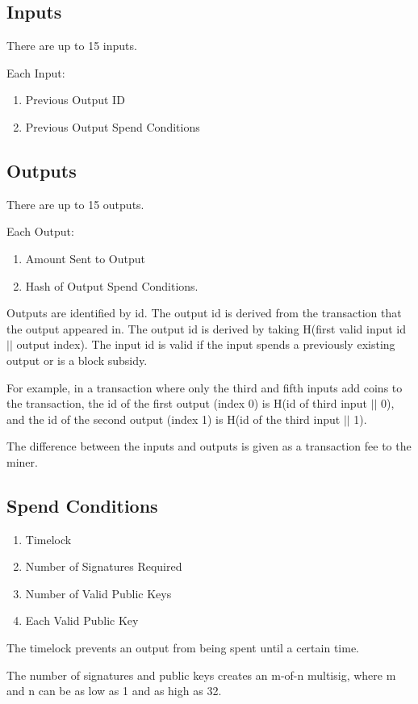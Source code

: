 \documentclass[twocolumn]{article}
\begin{document}
\subsection{Inputs}
There are up to 15 inputs.

Each Input:
\begin{enumerate}
	\item Previous Output ID
	\item Previous Output Spend Conditions
\end{enumerate}

\subsection{Outputs}
There are up to 15 outputs.

Each Output:
\begin{enumerate}
	\item Amount Sent to Output
	\item Hash of Output Spend Conditions.
\end{enumerate}

Outputs are identified by id.
The output id is derived from the transaction that the output appeared in.
The output id is derived by taking H(first valid input id $||$ output index).
The input id is valid if the input spends a previously existing output or is a block subsidy.

For example, in a transaction where only the third and fifth inputs add coins to the transaction, the id of the first output (index 0) is H(id of third input $||$ 0), and the id of the second output (index 1) is H(id of the third input $||$ 1).

The difference between the inputs and outputs is given as a transaction fee to the miner.

\subsection{Spend Conditions}
\begin{enumerate}
	\item Timelock
	\item Number of Signatures Required
	\item Number of Valid Public Keys
	\item Each Valid Public Key
\end{enumerate}

The timelock prevents an output from being spent until a certain time.

The number of signatures and public keys creates an m-of-n multisig, where m and n can be as low as 1 and as high as 32.
\end{document}
